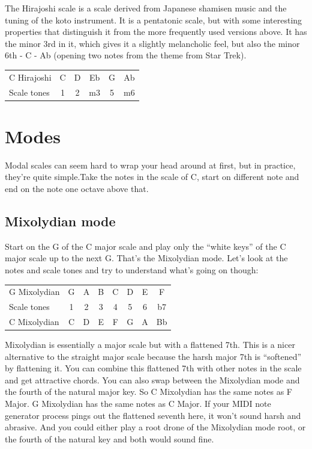 \documentclass[
  12pt,
  letterpaper,
  oneside,
  open=any]{scrbook}
\begin{document}
The Hirajoshi scale is a scale derived from Japanese shamisen music and
the tuning of the koto instrument. It is a pentatonic scale, but with
some interesting properties that distinguish it from the more frequently
used versions above. It has the minor 3rd in it, which gives it a
slightly melancholic feel, but also the minor 6th - C - Ab (opening two
notes from the theme from Star Trek).

\begin{longtable}[]{@{}lccccc@{}}
\toprule\noalign{}
\endhead
\bottomrule\noalign{}
\endlastfoot
C Hirajoshi & C & D & Eb & G & Ab \\
Scale tones & 1 & 2 & m3 & 5 & m6 \\
\end{longtable}

\section{Modes}\label{modes}

Modal scales can seem hard to wrap your head around at first, but in
practice, they're quite simple.Take the notes in the scale of C, start
on different note and end on the note one octave above that.

\subsection{Mixolydian mode}\label{mixolydian-mode}

Start on the G of the C major scale and play only the ``white keys'' of
the C major scale up to the next G. That's the Mixolydian mode. Let's
look at the notes and scale tones and try to understand what's going on
though:

\begin{longtable}[]{@{}lccccccc@{}}
\toprule\noalign{}
\endhead
\bottomrule\noalign{}
\endlastfoot
G Mixolydian & G & A & B & C & D & E & F \\
Scale tones & 1 & 2 & 3 & 4 & 5 & 6 & b7 \\
C Mixolydian & C & D & E & F & G & A & Bb \\
\end{longtable}

Mixolydian is essentially a major scale but with a flattened 7th. This
is a nicer alternative to the straight major scale because the harsh
major 7th is ``softened'' by flattening it. You can combine this
flattened 7th with other notes in the scale and get attractive chords.
You can also swap between the Mixolydian mode and the fourth of the
natural major key. So C Mixolydian has the same notes as F Major. G
Mixolydian has the same notes as C Major. If your MIDI note generator
process pings out the flattened seventh here, it won't sound harsh and
abrasive. And you could either play a root drone of the Mixolydian mode
root, or the fourth of the natural key and both would sound fine.
\end{document}
